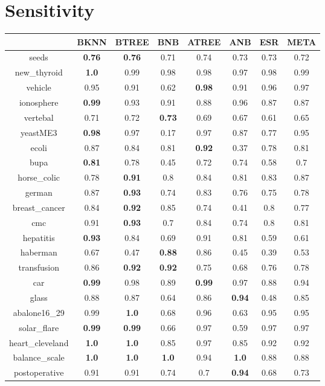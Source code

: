 \documentclass{article}%
\begin{document}
%
\section*{Sensitivity}%
\begin{tabular}{c|ccccccc}%
\hline%
&BKNN&BTREE&BNB&ATREE&ANB&ESR&META\\%
\hline%
seeds&\textbf{0.76}&\textbf{0.76}&0.71&0.74&0.73&0.73&0.72\\%
new\_thyroid&\textbf{1.0}&0.99&0.98&0.98&0.97&0.98&0.99\\%
vehicle&0.95&0.91&0.62&\textbf{0.98}&0.91&0.96&0.97\\%
ionosphere&\textbf{0.99}&0.93&0.91&0.88&0.96&0.87&0.87\\%
vertebal&0.71&0.72&\textbf{0.73}&0.69&0.67&0.61&0.65\\%
yeastME3&\textbf{0.98}&0.97&0.17&0.97&0.87&0.77&0.95\\%
ecoli&0.87&0.84&0.81&\textbf{0.92}&0.37&0.78&0.81\\%
bupa&\textbf{0.81}&0.78&0.45&0.72&0.74&0.58&0.7\\%
horse\_colic&0.78&\textbf{0.91}&0.8&0.84&0.81&0.83&0.87\\%
german&0.87&\textbf{0.93}&0.74&0.83&0.76&0.75&0.78\\%
breast\_cancer&0.84&\textbf{0.92}&0.85&0.74&0.41&0.8&0.77\\%
cmc&0.91&\textbf{0.93}&0.7&0.84&0.74&0.8&0.81\\%
hepatitis&\textbf{0.93}&0.84&0.69&0.91&0.81&0.59&0.61\\%
haberman&0.67&0.47&\textbf{0.88}&0.86&0.45&0.39&0.53\\%
transfusion&0.86&\textbf{0.92}&\textbf{0.92}&0.75&0.68&0.76&0.78\\%
car&\textbf{0.99}&0.98&0.89&\textbf{0.99}&0.97&0.88&0.94\\%
glass&0.88&0.87&0.64&0.86&\textbf{0.94}&0.48&0.85\\%
abalone16\_29&0.99&\textbf{1.0}&0.68&0.96&0.63&0.95&0.95\\%
solar\_flare&\textbf{0.99}&\textbf{0.99}&0.66&0.97&0.59&0.97&0.97\\%
heart\_cleveland&\textbf{1.0}&\textbf{1.0}&0.85&0.97&0.85&0.92&0.92\\%
balance\_scale&\textbf{1.0}&\textbf{1.0}&\textbf{1.0}&0.94&\textbf{1.0}&0.88&0.88\\%
postoperative&0.91&0.91&0.74&0.7&\textbf{0.94}&0.68&0.73\\%
\end{tabular}
\end{document}
